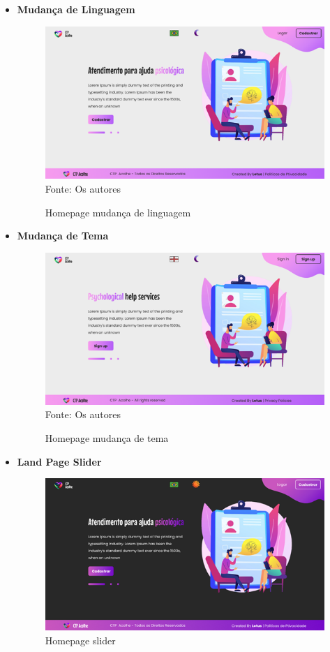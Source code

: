 \documentclass[12pt,a4paper]{article}
\begin{document}
\begin{itemize}
    \item \textbf{Mudança de Linguagem}
        \begin{figure}[H]
            \centering
            \caption{Homepage mudança de linguagem}
            \includegraphics[width=15cm]{prot.png}
            Fonte: Os autores
        \end{figure}
    \item \textbf{Mudança de Tema}
        \begin{figure}[H]
            \centering
            \caption{Homepage mudança de tema}
            \includegraphics[width=15cm]{prot2.png}
            Fonte: Os autores
        \end{figure} 
\newpage
    \item \textbf{Land Page Slider}
        \begin{figure}[H]
            \centering
            \caption{Homepage slider}
            \includegraphics[width=15cm]{prot3.png}

\end{figure}
\end{itemize}
\end{document}
